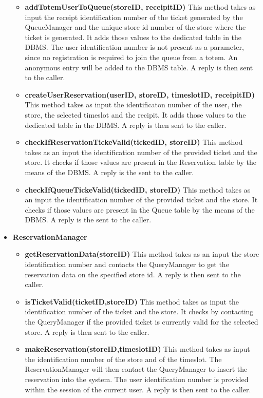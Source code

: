 \begin{itemize}
\begin{itemize}
        \item \textbf{addTotemUserToQueue(storeID, receipitID)}
        This method takes as input the receipt identification number of the ticket generated by the QueueManager and the unique store id number of the store where the ticket is generated. It adds those values to the dedicated table in the DBMS. The user identification number is not present as a parameter, since no registration is required to join the queue from a totem. An anonymous entry will be added to the DBMS table. A reply is then sent to the caller. 
        \item \textbf{createUserReservation(userID, storeID, timeslotID, receipitID)}
        This method takes as input the identificaton number of the user, the store, the selected timeslot and the recipit. It adds those values to the dedicated table in the DBMS. A reply is then sent to the caller. 
        \item \textbf{checkIfReservationTickeValid(tickedID, storeID)}
        This method takes as an input the identification number of the provided ticket and the store.
        It checks if those values are present in the Reservation table by the means of the DBMS. A reply is the sent to the caller.  
        \item \textbf{checkIfQueueTickeValid(tickedID, storeID)}
        This method takes as an input the identification number of the provided ticket and the store.
        It checks if those values are present in the Queue table by the means of the DBMS. A reply is the sent to the caller. 
        

    \end{itemize}

    \item \textbf{ReservationManager}
    \begin{itemize}
        \item \textbf{getReservationData(storeID)}
        This method takes as an input the store identification number and contacts the QueryManager to get the reservation data on the specified store id. A reply is then sent to the caller.

        \item \textbf{isTicketValid(ticketID,storeID)}
        This method takes as input the identification number of the ticket and the store. It checks by contacting the QueryManager if the provided ticket is currently valid for the selected store. 
        A reply is then sent to the caller. 

        \item \textbf{makeReservation(storeID,timeslotID)}
        This method takes as input the identification number of the store and of the timeslot. The ReservationManager will then contact the QueryManager to insert the reservation into the system. The user identification number is provided within the session of the current user. A reply is then sent to the caller. 


\end{itemize}
\end{itemize}
